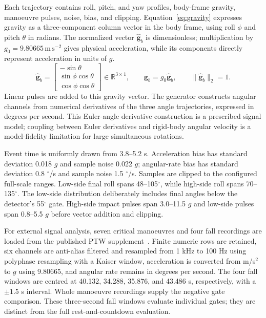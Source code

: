 \documentclass[10pt,a4paper]{article}
\newcommand{\degree}{\ensuremath{^{\circ}}}
\begin{document}
Each trajectory contains roll, pitch, and yaw profiles, body-frame gravity, manoeuvre pulses, noise, bias, and clipping. Equation~\eqref{eq:gravity} expresses gravity as a three-component column vector in the body frame, using roll $\phi$ and pitch $\theta$ in radians. The normalized vector $\widehat{\mathbf g}_b$ is dimensionless; multiplication by $g_0=9.80665\,\mathrm{m\,s^{-2}}$ gives physical acceleration, while its components directly represent acceleration in units of $g$.
\begin{equation}
\label{eq:gravity}
\widehat{\mathbf g}_b=
\begin{bmatrix}
-\sin\theta\\
\sin\phi\cos\theta\\
\cos\phi\cos\theta
\end{bmatrix}\in\mathbb R^{3\times1},\qquad
\mathbf g_b=g_0\widehat{\mathbf g}_b,\qquad
\|\widehat{\mathbf g}_b\|_2=1.
\end{equation}
Linear pulses are added to this gravity vector. The generator constructs angular channels from numerical derivatives of the three angle trajectories, expressed in degrees per second. This Euler-angle derivative construction is a prescribed signal model; coupling between Euler derivatives and rigid-body angular velocity is a model-fidelity limitation for large simultaneous rotations.

Event time is uniformly drawn from 3.8--5.2 s. Acceleration bias has standard deviation 0.018 $g$ and sample noise 0.022 $g$; angular-rate bias has standard deviation 0.8 $\degree$/s and sample noise 1.5 $\degree$/s. Samples are clipped to the configured full-scale ranges. Low-side final roll spans 48--105$\degree$, while high-side roll spans 70--135$\degree$. The low-side distribution deliberately includes final angles below the detector's 55$\degree$ gate. High-side impact pulses span 3.0--11.5 $g$ and low-side pulses span 0.8--5.5 $g$ before vector addition and clipping.

For external signal analysis, seven critical manoeuvres and four fall recordings are loaded from the published PTW supplement~\cite{boubezoul2019dataset}. Finite numeric rows are retained, six channels are anti-alias filtered and resampled from 1 kHz to 100 Hz using polyphase resampling with a Kaiser window, acceleration is converted from m/s$^2$ to $g$ using 9.80665, and angular rate remains in degrees per second. The four fall windows are centred at 40.132, 34.288, 35.876, and 43.486 s, respectively, with a $\pm1.5$ s interval. Whole manoeuvre recordings supply the negative gate comparison. These three-second fall windows evaluate individual gates; they are distinct from the full rest-and-countdown evaluation.
\end{document}
